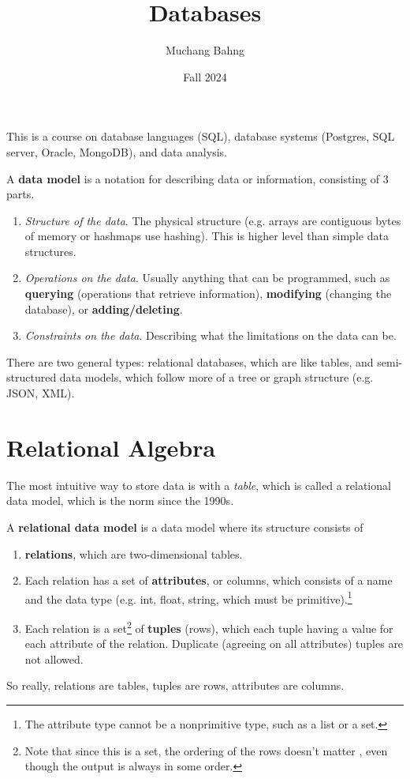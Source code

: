 \documentclass{article}
\begin{document}
\title{Databases}
\author{Muchang Bahng}
\date{Fall 2024}

\maketitle
\tableofcontents
\pagebreak

  This is a course on database languages (SQL), database systems (Postgres, SQL server, Oracle, MongoDB), and data analysis. 

  \begin{definition}
    A \textbf{data model} is a notation for describing data or information, consisting of 3 parts. 
    \begin{enumerate}
      \item \textit{Structure of the data}. The physical structure (e.g. arrays are contiguous bytes of memory or hashmaps use hashing). This is higher level than simple data structures. 
      \item \textit{Operations on the data}. Usually anything that can be programmed, such as \textbf{querying} (operations that retrieve information), \textbf{modifying} (changing the database), or \textbf{adding/deleting}. 
      \item \textit{Constraints on the data}. Describing what the limitations on the data can be. 
    \end{enumerate}
  \end{definition}

  There are two general types: relational databases, which are like tables, and semi-structured data models, which follow more of a tree or graph structure (e.g. JSON, XML).  

\section{Relational Algebra}

  The most intuitive way to store data is with a \textit{table}, which is called a relational data model, which is the norm since the 1990s. 

  \begin{definition}
    A \textbf{relational data model} is a data model where its structure consists of 
    \begin{enumerate}
      \item \textbf{relations}, which are two-dimensional tables. 
      \item Each relation has a set of \textbf{attributes}, or columns, which consists of a name and the data type (e.g. int, float, string, which must be primitive).\footnote{The attribute type cannot be a nonprimitive type, such as a list or a set. }
      \item Each relation is a set\footnote{Note that since this is a set, the ordering of the rows doesn't matter , even though the output is always in some order.} of \textbf{tuples} (rows), which each tuple having a value for each attribute of the relation. Duplicate (agreeing on all attributes) tuples are not allowed. 
    \end{enumerate}
    So really, relations are tables, tuples are rows, attributes are columns. 
  \end{definition}
\end{document}
